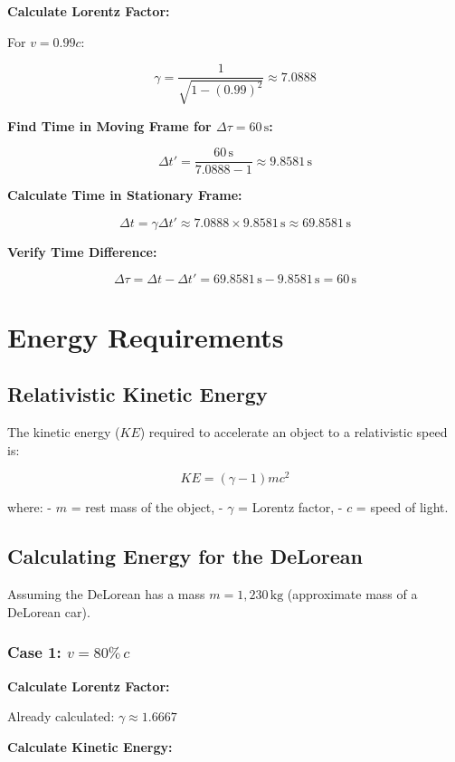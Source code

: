 \documentclass{article}
\begin{document}
\begin{multicols}{2}
\textbf{Calculate Lorentz Factor:}

For \( v = 0.99c \):

\[
\gamma = \frac{1}{\sqrt{1 - (0.99)^2}} \approx 7.0888
\]

\textbf{Find Time in Moving Frame for \(\Delta \tau = 60\, \text{s}\):}

\[
\Delta t' = \frac{60\, \text{s}}{7.0888 - 1} \approx 9.8581\, \text{s}
\]

\textbf{Calculate Time in Stationary Frame:}

\[
\Delta t = \gamma \Delta t' \approx 7.0888 \times 9.8581\, \text{s} \approx 69.8581\, \text{s}
\]

\textbf{Verify Time Difference:}

\[
\Delta \tau = \Delta t - \Delta t' = 69.8581\, \text{s} - 9.8581\, \text{s} = 60\, \text{s}
\]

\columnbreak

\section*{Energy Requirements}

\subsection*{Relativistic Kinetic Energy}

The kinetic energy (\( KE \)) required to accelerate an object to a relativistic speed is:

\[
KE = (\gamma - 1) m c^2
\]

where:
- \( m \) = rest mass of the object,
- \( \gamma \) = Lorentz factor,
- \( c \) = speed of light.

\subsection*{Calculating Energy for the DeLorean}

Assuming the DeLorean has a mass \( m = 1{,}230\, \text{kg} \) (approximate mass of a DeLorean car).

\subsubsection*{Case 1: \( v = 80\% \, c \)}

\textbf{Calculate Lorentz Factor:}

Already calculated: \( \gamma \approx 1.6667 \)

\textbf{Calculate Kinetic Energy:}


\end{multicols}
\end{document}
